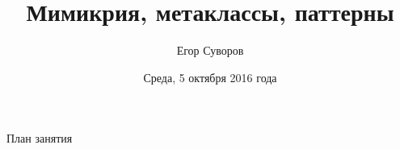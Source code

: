 \documentclass[utf8,xcolor=table]{beamer}
\title{Мимикрия, метаклассы, паттерны}
\author{Егор Суворов}
\institute[СПб АУ]{Курс <<Парадигмы и языки программирования>>, подгруппа 3}
\date[05.10.2016]{Среда, 5 октября 2016 года}
\begin{document}
\begin{frame}
\titlepage
\end{frame}

\begin{frame}{План занятия}
	\tableofcontents
\end{frame}












\end{document}
